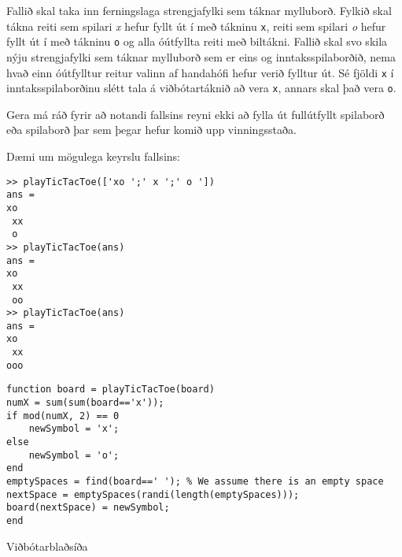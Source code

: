 \documentclass[addpoints]{exam}
\begin{document}
\begin{questions}
Fallið skal taka inn ferningslaga strengjafylki sem táknar mylluborð. Fylkið skal tákna reiti sem spilari \emph{x} hefur fyllt út í með tákninu \texttt{x}, reiti sem spilari \emph{o} hefur fyllt út í með tákninu \texttt{o} og alla óútfyllta reiti með biltákni. Fallið skal svo skila nýju strengjafylki sem táknar mylluborð sem er eins og inntaksspilaborðið, nema hvað einn óútfylltur reitur valinn af handahófi hefur verið fylltur út. Sé fjöldi \texttt{x} í inntaksspilaborðinu slétt tala á viðbótartáknið að vera \texttt{x}, annars skal það vera \texttt{o}.

Gera má ráð fyrir að notandi fallsins reyni ekki að fylla út fullútfyllt spilaborð eða spilaborð þar sem þegar hefur komið upp vinningsstaða.

Dæmi um mögulega keyrslu fallsins:
\begin{verbatim}
>> playTicTacToe(['xo ';' x ';' o '])
ans =
xo 
 xx
 o 
>> playTicTacToe(ans)
ans =
xo 
 xx
 oo
>> playTicTacToe(ans)
ans =
xo 
 xx
ooo
\end{verbatim}

\begin{solution}
\begin{verbatim}
function board = playTicTacToe(board)
numX = sum(sum(board=='x'));
if mod(numX, 2) == 0
    newSymbol = 'x';
else
    newSymbol = 'o';
end
emptySpaces = find(board==' '); % We assume there is an empty space
nextSpace = emptySpaces(randi(length(emptySpaces)));
board(nextSpace) = newSymbol;
end
\end{verbatim}

\end{solution}


\newpage Viðbótarblaðsíða

\end{questions}
\end{document}
